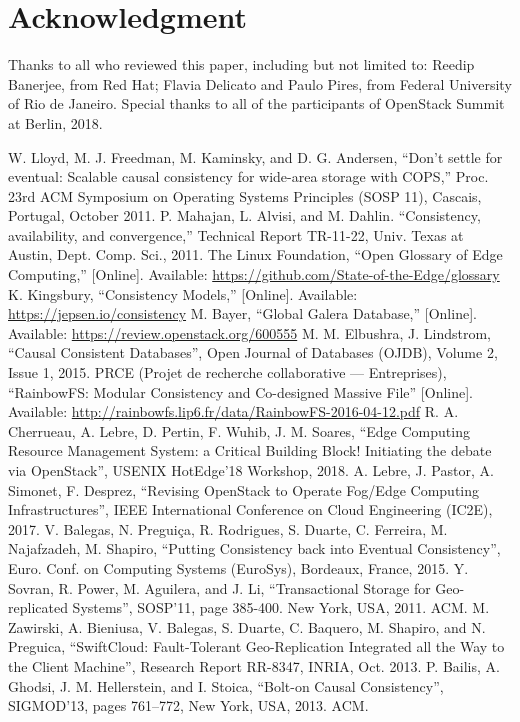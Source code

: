 \documentclass[conference]{IEEEtran}
\begin{document}
\section*{Acknowledgment}
Thanks to all who reviewed this paper, including but not limited to:
Reedip Banerjee, from Red Hat; Flavia Delicato and Paulo Pires, from Federal
University of Rio de Janeiro. Special thanks to all of the participants of
OpenStack Summit at Berlin, 2018.

\begin{thebibliography}{00}
 W. Lloyd, M. J. Freedman, M. Kaminsky, and D. G. Andersen, ``Don’t settle for eventual: Scalable causal consistency for wide-area storage with COPS,'' Proc. 23rd ACM Symposium on Operating Systems Principles (SOSP 11), Cascais, Portugal, October 2011.
 P. Mahajan, L. Alvisi, and M. Dahlin. ``Consistency, availability, and convergence,'' Technical Report TR-11-22, Univ. Texas at Austin, Dept. Comp. Sci., 2011.
 The Linux Foundation, ``Open Glossary of Edge Computing,'' [Online]. Available: \url{https://github.com/State-of-the-Edge/glossary}
 K. Kingsbury, ``Consistency Models,'' [Online]. Available: \url{https://jepsen.io/consistency}
 M. Bayer, ``Global Galera Database,'' [Online]. Available: \url{https://review.openstack.org/600555}
 M. M. Elbushra, J. Lindstrom, ``Causal Consistent Databases'', Open Journal of Databases (OJDB), Volume 2, Issue 1, 2015.
 PRCE (Projet de recherche collaborative — Entreprises), ``RainbowFS: Modular Consistency and Co-designed Massive File'' [Online]. Available: \url{http://rainbowfs.lip6.fr/data/RainbowFS-2016-04-12.pdf}
 R. A. Cherrueau, A. Lebre, D. Pertin, F. Wuhib, J. M. Soares, ``Edge Computing Resource Management System: a Critical Building Block! Initiating the debate via OpenStack'', USENIX HotEdge’18 Workshop, 2018.
 A. Lebre, J. Pastor, A. Simonet, F. Desprez, ``Revising OpenStack to Operate Fog/Edge Computing Infrastructures'', IEEE International Conference on Cloud Engineering (IC2E), 2017.
 V. Balegas, N. Preguiça, R. Rodrigues, S. Duarte, C. Ferreira, M. Najafzadeh, M. Shapiro, ``Putting Consistency back into Eventual Consistency'', Euro. Conf. on Computing Systems (EuroSys), Bordeaux, France, 2015.
 Y. Sovran, R. Power, M. Aguilera, and J. Li, ``Transactional Storage for Geo-replicated Systems'', SOSP'11, page 385-400. New York, USA, 2011. ACM.
 M. Zawirski, A. Bieniusa, V. Balegas, S. Duarte, C. Baquero, M. Shapiro, and N. Preguica, ``SwiftCloud: Fault-Tolerant Geo-Replication Integrated all the Way to the Client Machine'', Research Report RR-8347, INRIA, Oct. 2013.
 P. Bailis, A. Ghodsi, J. M. Hellerstein, and I. Stoica, ``Bolt-on Causal Consistency'', SIGMOD'13, pages 761–772, New York, USA, 2013. ACM.
\end{thebibliography}
\end{document}
